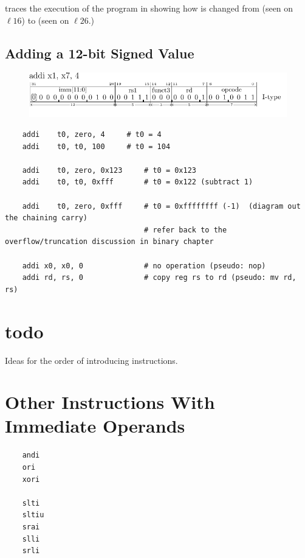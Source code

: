 
 traces the execution of the program in
 showing how  is changed from 
(seen on $\ell 16$) to  (seen on $\ell 26$.)



\subsection{Adding a 12-bit Signed Value}

\begin{figure}[H]
    \includegraphics{figures/chapter04/IType_addi_x1_x7_4.pdf}
\end{figure}


{\small
\begin{verbatim}
    addi    t0, zero, 4     # t0 = 4
    addi    t0, t0, 100     # t0 = 104

    addi    t0, zero, 0x123     # t0 = 0x123
    addi    t0, t0, 0xfff       # t0 = 0x122 (subtract 1)

    addi    t0, zero, 0xfff     # t0 = 0xffffffff (-1)  (diagram out the chaining carry)
                                # refer back to the overflow/truncation discussion in binary chapter

	addi x0, x0, 0				# no operation (pseudo: nop)
	addi rd, rs, 0				# copy reg rs to rd (pseudo: mv rd, rs)
\end{verbatim}
}

\section{todo}

Ideas for the order of introducing instructions.


\section{Other Instructions With Immediate Operands}

\label{uguide:andi}
\label{uguide:ori}
\label{uguide:xori}
\label{uguide:slti}
\label{uguide:sltiu}
\label{uguide:srai}
\label{uguide:slli}
\label{uguide:srli}
{\small
\begin{verbatim}
    andi
    ori
    xori

    slti
    sltiu
    srai
    slli
    srli
\end{verbatim}
}

